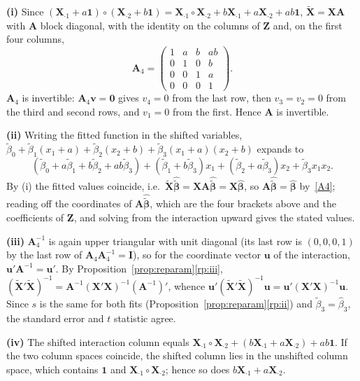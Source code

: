\documentclass[12pt,a4paper]{article}
\makeatletter
\theoremstyle{definition}
\renewenvironment{proof}[1][\proofname]{\par
  \pushQED{\qed}%
  \normalfont \topsep6\p@\@plus6\p@\relax
  \trivlist
  \item[\hskip\labelsep\bfseries #1\@addpunct{.}]\ignorespaces
}{%
  \popQED\endtrivlist\@endpefalse
}
\newcommand{\bX}{\mathbf{X}}
\def\bb{\boldsymbol{\beta}}
\newcommand{\bI}{\mathbf{I}}
\newcommand{\bone}{\mathbf{1}}
\newcommand{\bzero}{\mathbf{0}}
\newcommand{\bA}{\mathbf{A}}
\newcommand{\bv}{\mathbf{v}}
\makeatother
\begin{document}
\begin{proof}
\textbf{(i)} Since $(\bX_{\cdot 1} + a\bone) \circ (\bX_{\cdot 2} + b\bone) = \bX_{\cdot 1} \circ \bX_{\cdot 2} + b\bX_{\cdot 1} + a\bX_{\cdot 2} + ab\bone$, $\tilde{\bX} = \bX\bA$ with $\bA$ block diagonal, with the identity on the columns of $\mathbf{Z}$ and, on the first four columns,
\[
\bA_4 = \begin{pmatrix} 1 & a & b & ab\\ 0 & 1 & 0 & b\\ 0 & 0 & 1 & a\\ 0 & 0 & 0 & 1\end{pmatrix}.
\]
$\bA_4$ is invertible: $\bA_4\bv = \bzero$ gives $v_4 = 0$ from the last row, then $v_3 = v_2 = 0$ from the third and second rows, and $v_1 = 0$ from the first. Hence $\bA$ is invertible.

\textbf{(ii)} Writing the fitted function in the shifted variables, $\tilde\beta_0 + \tilde\beta_1(x_1 + a) + \tilde\beta_2(x_2 + b) + \tilde\beta_3(x_1 + a)(x_2 + b)$ expands to
\[
(\tilde\beta_0 + a\tilde\beta_1 + b\tilde\beta_2 + ab\tilde\beta_3) + (\tilde\beta_1 + b\tilde\beta_3)x_1 + (\tilde\beta_2 + a\tilde\beta_3)x_2 + \tilde\beta_3x_1x_2.
\]
By (i) the fitted values coincide, i.e.\ $\tilde{\bX}\hat{\tilde{\bb}} = \bX\bA\hat{\tilde{\bb}} = \bX\hat{\bb}$, so $\bA\hat{\tilde{\bb}} = \hat{\bb}$ by~\ref{A4}; reading off the coordinates of $\bA\hat{\tilde{\bb}}$, which are the four brackets above and the coefficients of $\mathbf{Z}$, and solving from the interaction upward gives the stated values.

\textbf{(iii)} $\bA_4^{-1}$ is again upper triangular with unit diagonal (its last row is $(0, 0, 0, 1)$ by the last row of $\bA_4\bA_4^{-1} = \bI$), so for the coordinate vector $\mathbf{u}$ of the interaction, $\mathbf{u}'\bA^{-1} = \mathbf{u}'$. By Proposition~\ref{prop:reparam}\ref{rp:iii}, $(\tilde{\bX}'\tilde{\bX})^{-1} = \bA^{-1}(\bX'\bX)^{-1}(\bA^{-1})'$, whence $\mathbf{u}'(\tilde{\bX}'\tilde{\bX})^{-1}\mathbf{u} = \mathbf{u}'(\bX'\bX)^{-1}\mathbf{u}$. Since $s$ is the same for both fits (Proposition~\ref{prop:reparam}\ref{rp:ii}) and $\tilde\beta_3 = \hat\beta_3$, the standard error and $t$ statistic agree.

\textbf{(iv)} The shifted interaction column equals $\bX_{\cdot 1} \circ \bX_{\cdot 2} + (b\bX_{\cdot 1} + a\bX_{\cdot 2}) + ab\bone$. If the two column spaces coincide, the shifted column lies in the unshifted column space, which contains $\bone$ and $\bX_{\cdot 1} \circ \bX_{\cdot 2}$; hence so does $b\bX_{\cdot 1} + a\bX_{\cdot 2}$.
\end{proof}
\end{document}
